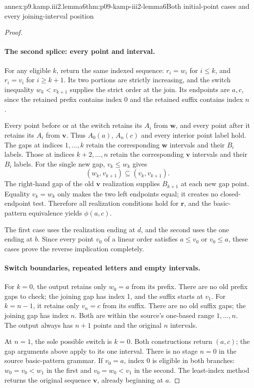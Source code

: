 \begin{annexitem}{annex:p9.kamp.iii2.lemma6}{thm:p09-kamp-iii2-lemma6}{Both initial-point cases and every joining-interval position}
\begin{proof}
\paragraph{The second splice: every point and interval.}
For any eligible \(k\), return the same indexed sequence:
\(r_i=w_i\) for \(i\leq k\), and \(r_i=v_i\) for
\(i\geq k+1\). Its two portions are strictly increasing, and the
switch inequality \(w_k<v_{k+1}\) supplies the strict order
at the join. Its endpoints are \(a,c\), since the retained
prefix contains index 0 and the retained suffix contains index \(n\).

Every point before or at the switch retains its \(A_i\) from
\(\mathbf w\), and every point after it retains its \(A_i\)
from \(\mathbf v\). Thus \(A_0(a)\), \(A_n(c)\) and every
interior point label hold. The gaps at indices \(1,\ldots,k\)
retain the corresponding \(\mathbf w\) intervals and their \(B_i\)
labels. Those at indices \(k+2,\ldots,n\) retain the
corresponding \(\mathbf v\) intervals and their \(B_i\) labels.
For the single new gap, \(v_k\leq w_k\) gives
\[
                         (w_k,v_{k+1})\subseteq(v_k,v_{k+1}).
\]
The right-hand gap of the old \(\mathbf v\) realization supplies
\(B_{k+1}\) at each new gap point. Equality \(v_k=w_k\)
only makes the two left endpoints equal; it creates no closed-endpoint
test. Therefore all realization conditions hold for \(\mathbf r\),
and the basic-pattern equivalence yields \(\phi(a,c)\).

The first case uses the realization ending at \(d\), and the
second uses the one ending at \(b\). Since every point \(v_0\)
of a linear order satisfies \(a\leq v_0\) or \(v_0\leq a\),
these cases prove the reverse implication completely.

\paragraph{Switch boundaries, repeated letters and empty intervals.}
For \(k=0\), the output retains only \(w_0=a\) from its prefix.
There are no old prefix gaps to check; the joining gap has index 1,
and the suffix starts at \(v_1\). For \(k=n-1\), it retains
only \(v_n=c\) from its suffix. There are no old suffix gaps;
the joining gap has index \(n\). Both are within the source's
one-based range \(1,\ldots,n\). The output always has \(n+1\)
points and the original \(n\) intervals.

At \(n=1\), the sole possible switch is \(k=0\). Both
constructions return \((a,c)\); the gap arguments above apply
to its one interval. There is no stage \(n=0\) in the source
basic-pattern grammar. If \(v_0=a\), index 0 is eligible in
both branches: \(w_0=v_0<w_1\) in the first and
\(v_0=w_0<v_1\) in the second. The least-index method returns
the original sequence \(\mathbf v\), already beginning at \(a\).


\end{proof}
\end{annexitem}

